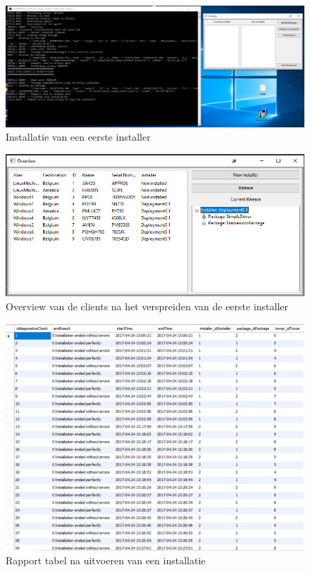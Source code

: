 \begin{figure}
\centering
\includegraphics[width=\textwidth,height=\textheight,keepaspectratio]{afbeelding/testMultiClient/NaDeployment1_cut.png}
\caption{Installatie van een eerste installer}
\label{fig:testClient:installDeployment1}
\end{figure}

\begin{figure}[!ht]
\centering
\includegraphics[width=\textwidth,keepaspectratio]{afbeelding/testMultiClient/OverviewNaRelease.png}
\caption{Overview van de clients na het verspreiden van de eerste installer}
\label{fig:testClient:overviewNaDeployment1}
\end{figure}

\begin{figure}[!ht]
\centering
\includegraphics[width=\textwidth,keepaspectratio]{afbeelding/testMultiClient/RapportsDB.png}
\caption{Rapport tabel na uitvoeren van een installatie}
\label{fig:testClient:rapportDB}
\end{figure}

